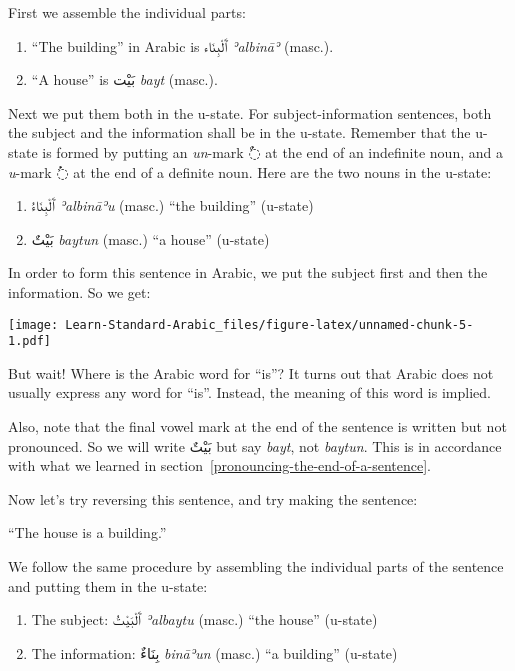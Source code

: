 \documentclass[
  10pt,
]{book}
\providecommand{\tightlist}{%
  \setlength{\itemsep}{0pt}\setlength{\parskip}{0pt}}
\begin{document}
First we assemble the individual parts:

\begin{enumerate}
\def\labelenumi{\roman{enumi}.}
\tightlist
\item
  \enquote{The building} in Arabic is \foreignlanguage{arabic}{ٱَلْبِنَاء} \emph{ʾalbināʾ} (masc.).
\item
  \enquote{A house} is \foreignlanguage{arabic}{بَيْت} \emph{bayt} (masc.).
\end{enumerate}

Next we put them both in the u-state. For subject-information sentences, both the subject and the information shall be in the u-state. Remember that the u-state is formed by putting an \emph{un}-mark \foreignlanguage{arabic}{◌ٌ} at the end of an indefinite noun, and a \emph{u}-mark \foreignlanguage{arabic}{◌ُ} at the end of a definite noun. Here are the two nouns in the u-state:

\begin{enumerate}
\def\labelenumi{\roman{enumi}.}
\tightlist
\item
  \foreignlanguage{arabic}{ٱَلْبِنَاءُ} \emph{ʾalbināʾu} (masc.) \enquote{the building} (u-state)
\item
  \foreignlanguage{arabic}{بَيْتٌ} \emph{baytun} (masc.) \enquote{a house} (u-state)
\end{enumerate}

In order to form this sentence in Arabic, we put the subject first and then the information. So we get:

\texttt{[image: Learn-Standard-Arabic\_files/figure-latex/unnamed-chunk-5-1.pdf]}

But wait! Where is the Arabic word for \enquote{is}? It turns out that Arabic does not usually express any word for \enquote{is}. Instead, the meaning of this word is implied.

Also, note that the final vowel mark at the end of the sentence is written but not pronounced. So we will write
\foreignlanguage{arabic}{بَيْتٌ} but say
\emph{bayt}, not
\emph{baytun}.
This is in accordance with what we learned in section~\ref{pronouncing-the-end-of-a-sentence}.

Now let's try reversing this sentence, and try making the sentence:

\enquote{The house is a building.}

We follow the same procedure by assembling the individual parts of the sentence and putting them in the u-state:

\begin{enumerate}
\def\labelenumi{\roman{enumi}.}
\tightlist
\item
  The subject: \foreignlanguage{arabic}{ٱَلْبَيْتُ} \emph{ʾalbaytu} (masc.) \enquote{the house} (u-state)
\item
  The information: \foreignlanguage{arabic}{بِنَاءٌ} \emph{bināʾun} (masc.) \enquote{a building} (u-state)
\end{enumerate}
\end{document}
